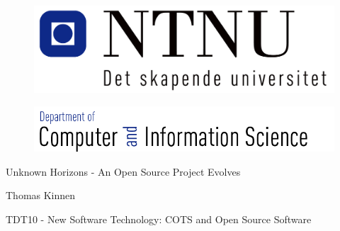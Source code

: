 \pagestyle{empty}

\begin{titlepage}
\begin{center}

\begin{figure}[!htb]
	\begin{center}
		\includegraphics[scale=0.50]{pics/ntnu}
	\end{center}
\end{figure}
\begin{figure}[!htb]
	\begin{center}
		\includegraphics[scale=0.40]{pics/idi}
	\end{center}
\end{figure}
\begin{LARGE}
\vspace{1.2in}

\end{LARGE}
\begin{Huge}
Unknown Horizons - An Open Source Project Evolves
\vspace{1.7in}


\end{Huge}
\begin{LARGE}
Thomas Kinnen \vspace{0.6in}
\end{LARGE}

\begin{Large}
TDT10 - New Software Technology: COTS and Open Source Software
\vspace{0.8in}
\end{Large}



\end{center}

\end{titlepage}
